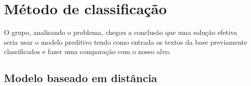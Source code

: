 \section{Método de classificação}
O grupo, analisando o problema, chegou a conclusão que uma solução efetiva seria usar o modelo preditivo tendo como entrada os textos da base previamente classificados e fazer uma comparação com o nosso alvo.

\subsection{Modelo baseado em distância}


